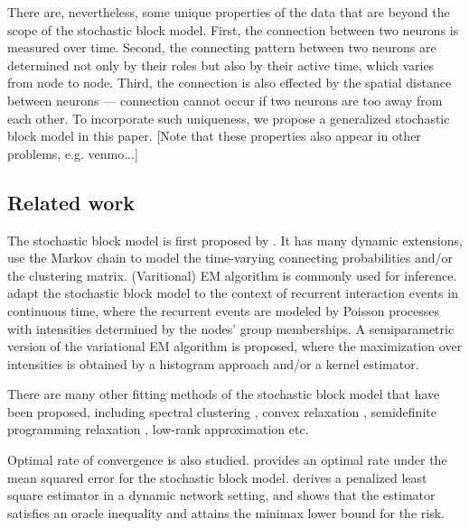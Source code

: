 There are, nevertheless, some unique properties of the data that are beyond the scope of the stochastic block model.
First, the connection between two neurons is measured over time.
Second, the connecting pattern between two neurons are determined not only by their roles but also by their active time, which varies from node to node.
Third, the connection is also effected by the spatial distance between neurons --- connection cannot occur if two neurons are too away from each other.
To incorporate such uniqueness, we propose a generalized stochastic block model in this paper.
[Note that these properties also appear in other problems, e.g. venmo...]


\subsection*{Related work}
	The stochastic block model is first proposed by \citet{Holland1983}.
	It has many dynamic extensions,
	\citet{Yang2011,Xu2014a,Matias2016,Xu2015} use the Markov chain to model the time-varying  connecting probabilities and/or the clustering matrix. 
	(Varitional) EM algorithm is commonly used for inference.
	\citet{Matias2018} adapt the stochastic block model to the context of recurrent interaction events in continuous time, 
	where the recurrent events are modeled by Poisson processes with intensities determined by the nodes' group memberships. 
	A semiparametric version of the variational EM algorithm is proposed, where the maximization over intensities is obtained by a histogram approach and/or a kernel estimator.

	There are many other fitting methods of the stochastic block model that have been proposed, including spectral clustering \citet{Liu2018}, convex relaxation \citet{Li2018,Chen2014}, semidefinite programming relaxation \citet{Amini2018}, low-rank approximation \citet{Le2016b} etc.

	Optimal rate of convergence is also studied.
	\citet{Gao2015a} provides an optimal rate under the mean squared error for the stochastic block model.
	\citet{Pensky2019a} 
	derives a penalized least square estimator in a dynamic network setting, and shows that the estimator satisfies an oracle inequality and  attains the minimax lower bound for the risk.








